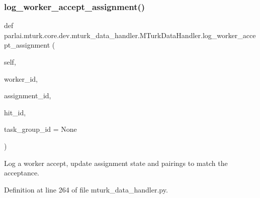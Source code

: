 \subsubsection{\texorpdfstring{log\+\_\+worker\+\_\+accept\+\_\+assignment()}{log\_worker\_accept\_assignment()}}
{\footnotesize\ttfamily def parlai.\+mturk.\+core.\+dev.\+mturk\+\_\+data\+\_\+handler.\+M\+Turk\+Data\+Handler.\+log\+\_\+worker\+\_\+accept\+\_\+assignment (\begin{DoxyParamCaption}\item[{}]{self,  }\item[{}]{worker\+\_\+id,  }\item[{}]{assignment\+\_\+id,  }\item[{}]{hit\+\_\+id,  }\item[{}]{task\+\_\+group\+\_\+id = {\ttfamily None} }\end{DoxyParamCaption})}

\begin{DoxyVerb}Log a worker accept, update assignment state and pairings to match the
acceptance.
\end{DoxyVerb}
 

Definition at line 264 of file mturk\+\_\+data\+\_\+handler.\+py.


